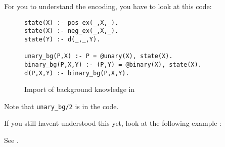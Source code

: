 
For you to understand the encoding, you have to look at this code:
\begin{figure}
\begin{verbatim}
state(X) :- pos_ex(_,X,_).
state(X) :- neg_ex(_,X,_).
state(Y) :- d(_,_,Y).

unary_bg(P,X) :- P = @unary(X), state(X).
binary_bg(P,X,Y) :- (P,Y) = @binary(X), state(X).
d(P,X,Y) :- binary_bg(P,X,Y).
\end{verbatim}
\caption{Import of background knowledge in }
\label{fig:bk_import_fc}
\end{figure}
Note that \verb|unary_bg/2| is in the code.

If you still havent understood this yet, look at the following example :
\begin{example}
\label{ex:fc_bk}
See .
\end{example}
